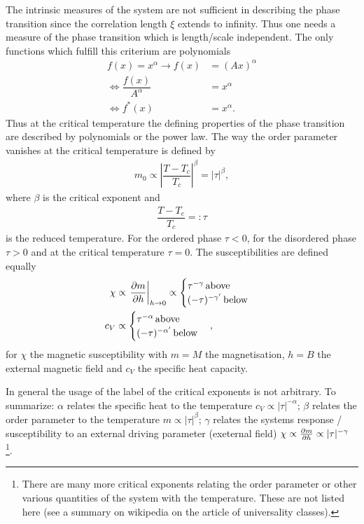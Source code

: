 \documentclass[a4paper,10pt]{article}
\numberwithin{equation}{section}
\begin{document}
\begin{multicols}{2}
The intrinsic measures of the system are not sufficient in describing the phase transition since the correlation length $\xi $ extends to infinity.
Thus one needs a measure of the phase transition which is length/scale independent.
The only functions which fulfill this criterium are polynomials
\begin{align} 
  f(x) = x^\alpha \rightarrow f(x) &= (Ax)^\alpha \\
  \Leftrightarrow \dfrac{f(x)}{A^\alpha } &= x^\alpha \\
  \Leftrightarrow f^*(x) &= x^\alpha 
.\end{align} 
Thus at the critical temperature the defining properties of the phase transition are described by polynomials or the power law.
The way the order parameter vanishes at the critical temperature is defined by
\begin{align} 
  m_0\propto \left|\dfrac{T-T_c}{T_c}\right|^\beta =|\tau |^\beta 
,\end{align} 
where $\beta $ is the critical exponent and 
\begin{align} 
  \dfrac{T-T_c}{T_c}=:\tau 
\end{align} 
is the reduced temperature.
For the ordered phase $\tau <0$, for the disordered phase $\tau >0$ and at the critical temperature $\tau =0$.
The susceptibilities are defined equally
\begin{align} 
  \chi  &\propto \left.\diffp[]{m}{h}\right|_{h\rightarrow 0}\propto \begin{cases}
    \tau ^{-\gamma }\, \text{above}\\
    (-\tau )^{-\gamma '} \, \text{below}\\
  \end{cases}\\
  c_V &\propto \begin{cases}
    \tau ^{-\alpha }\, \text{above}\\
    (-\tau )^{-\alpha '}\, \text{below}
  \end{cases}
,\end{align} 
for $\chi $ the magnetic susceptibility with $m=M$ the magnetisation, $h=B$ the external magnetic field and $c_V$ the specific heat capacity.

In general the usage of the label of the critical exponents is not arbitrary.
To summarize:
$\alpha $ relates the specific heat to the temperature $c_V\propto|\tau |^{-\alpha }$; $\beta $ relates the order parameter to the temperature $m\propto|\tau |^{\beta }$; $\gamma $ relates the systems response / susceptibility to an external driving parameter (exeternal field) $\chi \propto\diffp[]{m}{h}\propto|\tau |^{-\gamma }$
\footnote{There are many more critical exponents relating the order parameter or other various quantities of the system with the temperature.
These are not listed here (see a summary on wikipedia on the article of universality classes).}.


\end{multicols}
\end{document}

